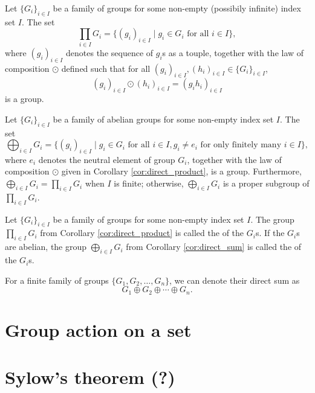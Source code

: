 \begin{cor}\label{cor:direct_product}
Let $ \{G_i\}_{i\in I} $ be a family of groups for some non-empty (possibily infinite) index set $ I $. The set
\begin{equation*}
    \prod_{i\in I}G_i=\{(g_i)_{i\in I}\mid g_i\in G_i\text{ for all }i\in I\},
\end{equation*}
where $ (g_i)_{i\in I} $ denotes the sequence of $ g_i $s as a touple, together with the law of composition $ \odot $ defined such that for all $ (g_i)_{i\in I},(h_i)_{i\in I}\in\{G_i\}_{i\in I} $,
\begin{equation*}
    (g_i)_{i\in I}\odot(h_i)_{i\in I}=(g_ih_i)_{i\in I}
\end{equation*}
is a group.
\end{cor}

\begin{cor}\label{cor:direct_sum}
Let $ \{G_i\}_{i\in I} $ be a family of abelian groups for some non-empty index set $ I $. The set
\begin{equation*}
    \bigoplus_{i\in I}G_i=\{(g_i)_{i\in I}\mid g_i\in G_i\text{ for all }i\in I, g_i\neq e_i\text{ for only finitely many }i\in I\},
\end{equation*}
where $ e_i $ denotes the neutral element of group $ G_i $, together with the law of composition $ \odot $ given in Corollary \ref{cor:direct_product}, is a group. Furthermore, $ \bigoplus_{i\in I}G_i=\prod_{i\in I}G_i $ when $ I $ is finite; otherwise, $ \bigoplus_{i\in I}G_i $ is a proper subgroup of $ \prod_{i\in I}G_i $.
\end{cor}

\begin{defn}
Let $ \{G_i\}_{i\in I} $ be a family of groups for some non-empty index set $ I $. The group $ \prod_{i\in I}G_i $ from Corollary \ref{cor:direct_product} is called the  of the $ G_i $s. If the $ G_i $s are abelian, the group $ \bigoplus_{i\in I}G_i $ from Corollary \ref{cor:direct_sum} is called the  of the $ G_i $s.
\end{defn}

For a finite family of groups $ \{G_1,G_2,\ldots,G_n\} $, we can denote their direct sum as
\begin{equation*}
    G_1\oplus G_2\oplus\cdots\oplus G_n.
\end{equation*}

\section{Group action on a set}

\section{Sylow's theorem (?)}

